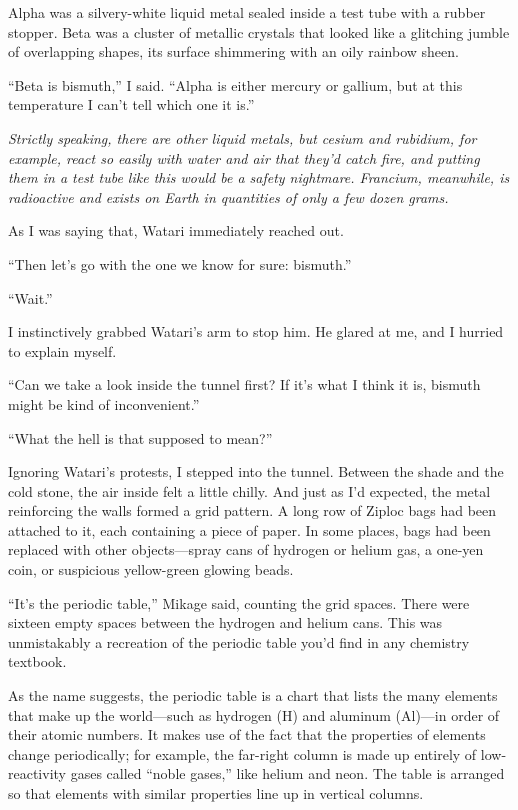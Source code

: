\documentclass[
    a4paper,
    12pt,
    twoside,
    openany,
    UTF8,
    fontset=windows
]{ctexbook}
\begin{document}
Alpha was a silvery-white liquid metal sealed inside a test tube with a rubber stopper. Beta was a cluster of metallic crystals that looked like a glitching jumble of overlapping shapes, its surface shimmering with an oily rainbow sheen.

``Beta is bismuth,'' I said. ``Alpha is either mercury or gallium, but at this temperature I can't tell which one it is.''

\textit{Strictly speaking, there are other liquid metals, but cesium and rubidium, for example, react so easily with water and air that they'd catch fire, and putting them in a test tube like this would be a safety nightmare. Francium, meanwhile, is radioactive and exists on Earth in quantities of only a few dozen grams.}

As I was saying that, Watari immediately reached out.

``Then let's go with the one we know for sure: bismuth.''

``Wait.''

I instinctively grabbed Watari's arm to stop him. He glared at me, and I hurried to explain myself.

``Can we take a look inside the tunnel first? If it's what I think it is, bismuth might be kind of inconvenient.''

``What the hell is that supposed to mean?''

Ignoring Watari's protests, I stepped into the tunnel. Between the shade and the cold stone, the air inside felt a little chilly. And just as I'd expected, the metal reinforcing the walls formed a grid pattern. A long row of Ziploc bags had been attached to it, each containing a piece of paper. In some places, bags had been replaced with other objects---spray cans of hydrogen or helium gas, a one-yen coin, or suspicious yellow-green glowing beads.

``It's the periodic table,'' Mikage said, counting the grid spaces. There were sixteen empty spaces between the hydrogen and helium cans. This was unmistakably a recreation of the periodic table you'd find in any chemistry textbook.

As the name suggests, the periodic table is a chart that lists the many elements that make up the world---such as hydrogen (H) and aluminum (Al)---in order of their atomic numbers. It makes use of the fact that the properties of elements change periodically; for example, the far-right column is made up entirely of low-reactivity gases called ``noble gases,'' like helium and neon. The table is arranged so that elements with similar properties line up in vertical columns.
\end{document}
